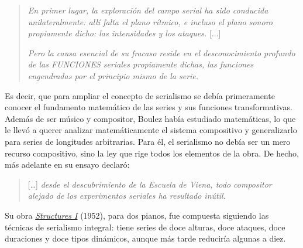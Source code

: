     \begin{quote}\emph{En primer lugar, la exploraci\'on del campo serial ha sido conducida unilateralmente: all\'i falta el plano r\'itmico, e incluso el plano sonoro propiamente dicho: las intensidades y los ataques.} [$\ldots$] 
    	
    \emph{Pero la causa esencial de su fracaso reside en el desconocimiento profundo de las FUNCIONES seriales propiamente dichas, las funciones engendradas por el principio mismo de la serie.}\end{quote}
    
	Es decir, que para ampliar el concepto de serialismo se deb\'ia primeramente conocer el fundamento matem\'atico de las series y sus funciones transformativas. Adem\'as de ser m\'usico y compositor, Boulez hab\'ia estudiado matem\'aticas, lo que le llev\'o a querer analizar matem\'aticamente el sistema compositivo y generalizarlo para series de longitudes arbitrarias. Para \'el, el serialismo no deb\'ia ser un mero recurso compositivo, sino la ley que rige todos los elementos de la obra. De hecho, m\'as adelante en su ensayo declar\'o:
    
    \begin{quote}[\ldots] \emph{desde el descubrimiento de la Escuela de Viena, todo compositor alejado de los experimentos seriales ha resultado in\'util.}\end{quote}

	Su obra \href{https://www.youtube.com/watch?v=QUF3XPTIlJo}{\emph{Structures I}} (1952), para dos pianos, fue compuesta siguiendo las t\'ecnicas de serialismo integral: tiene series de doce alturas, doce ataques, doce duraciones y doce tipos din\'amicos, aunque m\'as tarde reducir\'ia algunas a diez.